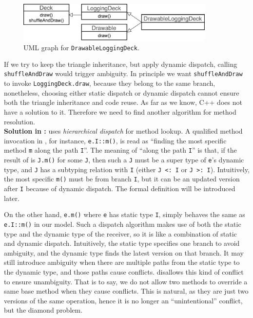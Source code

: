 \begin{figure}[t]
  \centering
  \includegraphics[height=2cm]{pics/DrawableLoggingDeck.pdf}
  \caption{UML graph for \lstinline|DrawableLoggingDeck|.}\label{fig:drawableloggingdeck}
\end{figure}
If we try to keep the triangle inheritance, but apply dynamic dispatch, calling \lstinline|shuffleAndDraw| would trigger ambiguity. 
In principle we want \lstinline|shuffleAndDraw| to invoke \lstinline|LoggingDeck.draw|, because they belong to the same branch, 
nonetheless, choosing either static dispatch
or dynamic dispatch cannot ensure both the triangle inheritance and code reuse. As far as we know, C++ does not have a solution
to it. Therefore we need to find another algorithm for method resolution.\\

\noindent\textbf{Solution in \name{}:} \name{} uses \textit{hierarchical dispatch} for method lookup. A qualified
method invocation in \name{}, for instance, \lstinline|e.I::m()|, is read as
``finding the most specific method \lstinline|m| along the path
\lstinline|I|''. The meaning of ``along the path \lstinline|I|'' is
that, if the result of \dispatch{} is \lstinline|J.m()| for some \lstinline|J|, then such a \lstinline|J| must be a super type of \lstinline|e|'s dynamic type, and \lstinline|J| has a subtyping relation with \lstinline|I| (either \lstinline|J <: I| or \lstinline|J >: I|). Intuitively, the most specific \lstinline|m()| must be from branch \lstinline|I|, but it can be an updated version after \lstinline|I| because of dynamic dispatch. The formal definition will be introduced later.

On the other hand, \lstinline|e.m()| where \lstinline|e| has static type \lstinline|I|, simply behaves the same as \lstinline|e.I::m()| in our model. Such a dispatch algorithm makes use of both the static type and the dynamic type of the receiver, so it is like a combination of static and dynamic dispatch. Intuitively, the static type specifies one branch to avoid ambiguity, and the dynamic type finds the latest version on that branch. It may still introduce ambiguity when there are multiple paths from the static type to the dynamic type, and those paths cause conflicts. \name{} disallows this kind of conflict to ensure unambiguity. That is to say, we do not allow two methods to override a same base method when they cause conflicts. This is natural, as they are just two versions of the same operation, hence it is no longer an ``unintentional'' conflict, but the diamond problem.

